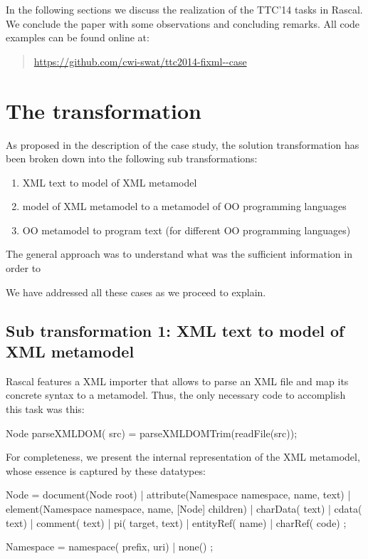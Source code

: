 \documentclass[submission,copyright,creativecommons]{eptcs}
\begin{document}
In the following sections we discuss the realization of the TTC'14 tasks in Rascal. We conclude the paper with some observations and concluding remarks. 
All code examples  can be found  online at:
\begin{quote}
\url{https://github.com/cwi-swat/ttc2014-fixml--case}
\end{quote}

\section{The transformation}

As proposed in the description of the case study, the solution transformation has been broken down into the following sub transformations:

\begin{enumerate}
\item XML text to model of XML metamodel
\item model of XML metamodel to a metamodel of OO programming languages
\item OO metamodel to program text (for different OO programming languages)
\end{enumerate}

The general approach was to understand what was the sufficient information in order to 

We have addressed all these cases as we proceed to explain.

\subsection{Sub transformation 1: XML text to model of XML metamodel}

Rascal features a XML importer that allows to parse an XML file and map its concrete syntax to a metamodel. Thus, the only necessary code to accomplish this task was this:

\begin{rascal}
Node parseXMLDOM( src) = parseXMLDOMTrim(readFile(src));
\end{rascal}

For completeness, we present the internal representation of the XML metamodel, whose essence is captured by these datatypes:

\begin{rascal}
 Node 
     = document(Node root)
     | attribute(Namespace namespace,  name,  text)
     | element(Namespace namespace,  name, [Node] children)
     | charData( text)
     | cdata( text)
     | comment( text)
     | pi( target,  text)
     | entityRef( name)
     | charRef( code)
     ;  
          
 Namespace 
     = namespace( prefix,  uri)
     | none()
     ;
\end{rascal}
\end{document}
